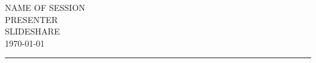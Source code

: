\documentclass[pdflatex,11pt, oneside]{article}
\newcommand{\HRule}{\rule{\linewidth}{0.5mm}}
\newcommand{\BottomHRule}{\rule{\linewidth}{0.1mm}}
\begin{document}
\noindent
\textsf{{\Large NAME OF SESSION} \\PRESENTER\\SLIDESHARE\\\today}
\\\HRule
\begin{outline}
\1 
	\2 
\end{outline} 


\end{document}
